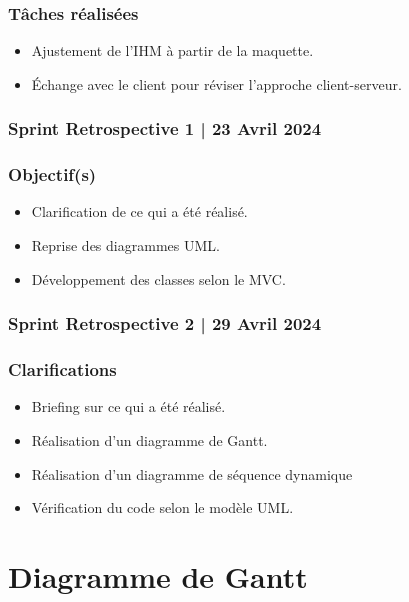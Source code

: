 	\subsubsection*{Tâches réalisées}
	\begin{itemize}
		\item Ajustement de l’IHM à partir de la maquette.
		\item Échange avec le client pour réviser l’approche client-serveur.
	\end{itemize}
	
	\subsubsection{Sprint Retrospective 1 | 23 Avril 2024}
	\subsubsection*{Objectif(s)}
	\begin{itemize}
		\item Clarification de ce qui a été réalisé.
		\item Reprise des diagrammes UML.
		\item Développement des classes selon le MVC.
	\end{itemize}
	
	\subsubsection{Sprint Retrospective 2 | 29 Avril 2024}
	\subsubsection*{Clarifications}
	\begin{itemize}
		\item Briefing sur ce qui a été réalisé.
		\item Réalisation d'un diagramme de Gantt.
		\item Réalisation d'un diagramme de séquence dynamique
		\item Vérification du code selon le modèle UML.
	\end{itemize}
	
	



\section{Diagramme de Gantt}

